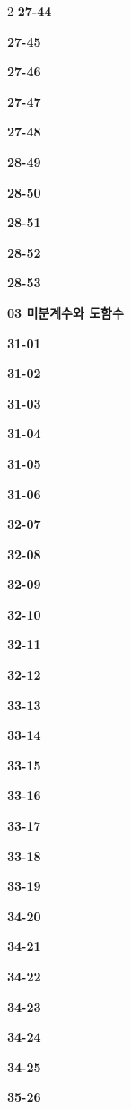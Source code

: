 \documentclass[10pt,a4paper]{article}
\begin{document}
\begin{multicols}{2}
\noindent\textbf{27-44}\ \par
\noindent\textbf{27-45}\ \par
\noindent\textbf{27-46}\ \par
\noindent\textbf{27-47}\ \par
\noindent\textbf{27-48}\ \par
\noindent\textbf{28-49}\ \par
\noindent\textbf{28-50}\ \par
\noindent\textbf{28-51}\ \par
\noindent\textbf{28-52}\ \par
\noindent\textbf{28-53}\ \par
\noindent\textbf{03 미분계수와 도함수}\par\smallskip
\noindent\textbf{31-01}\ \par
\noindent\textbf{31-02}\ \par
\noindent\textbf{31-03}\ \par
\noindent\textbf{31-04}\ \par
\noindent\textbf{31-05}\ \par
\noindent\textbf{31-06}\ \par
\noindent\textbf{32-07}\ \par
\noindent\textbf{32-08}\ \par
\noindent\textbf{32-09}\ \par
\noindent\textbf{32-10}\ \par
\noindent\textbf{32-11}\ \par
\noindent\textbf{32-12}\ \par
\noindent\textbf{33-13}\ \par
\noindent\textbf{33-14}\ \par
\noindent\textbf{33-15}\ \par
\noindent\textbf{33-16}\ \par
\noindent\textbf{33-17}\ \par
\noindent\textbf{33-18}\ \par
\noindent\textbf{33-19}\ \par
\noindent\textbf{34-20}\ \par
\noindent\textbf{34-21}\ \par
\noindent\textbf{34-22}\ \par
\noindent\textbf{34-23}\ \par
\noindent\textbf{34-24}\ \par
\noindent\textbf{34-25}\ \par
\noindent\textbf{35-26}\ \par

\end{multicols}
\end{document}
